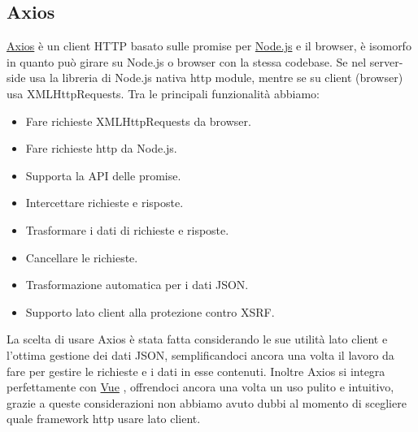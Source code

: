\documentclass{article}
\newcommand{\node}{\href{https://nodejs.org/it/}{Node.js} }
\newcommand{\vue}{\href{https://vuejs.org/}{Vue} }
\newcommand{\axios}{\href{https://axios-http.com/}{Axios} }
\begin{document}
\subsection{Axios}
\axios è un client HTTP basato sulle promise per \node e il browser, è isomorfo in quanto può girare su Node.js o browser con la stessa codebase. Se nel server-side usa la libreria di Node.js nativa http module, mentre se su client (browser) usa XMLHttpRequests.
Tra le principali funzionalità abbiamo:
\begin{itemize}
	\item Fare richieste XMLHttpRequests da browser.
	\item Fare richieste http da Node.js.
	\item Supporta la API delle promise.
	\item Intercettare richieste e risposte.
	\item Trasformare i dati di richieste e risposte.
	\item Cancellare le richieste.
	\item Trasformazione automatica per i dati JSON.
	\item Supporto lato client alla protezione contro XSRF.
\end{itemize}
La scelta di usare Axios è stata fatta considerando le sue utilità lato client e l'ottima gestione dei dati JSON, semplificandoci ancora una volta il lavoro da fare per gestire le richieste e i dati in esse contenuti. Inoltre Axios si integra perfettamente con \vue, offrendoci ancora una volta un uso pulito e intuitivo, grazie a queste considerazioni non abbiamo avuto dubbi al momento di scegliere quale framework http usare lato client.
\end{document}
